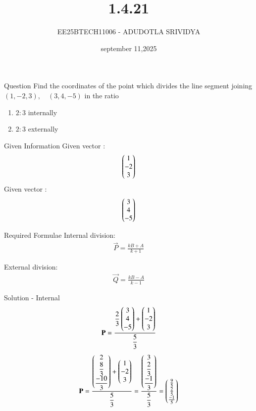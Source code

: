 \documentclass{beamer}
\title %
{1.4.21}
\date{september 11,2025}
\author %
{EE25BTECH11006 - ADUDOTLA SRIVIDYA}
\begin{document}
\frame{\titlepage}

\begin{frame}{Question}
Find the coordinates of the point which divides the line segment joining
$
(1,-2,3), \quad (3,4,-5)
$
in the ratio
\begin{enumerate}[label=(\alph*)]
    \item \(2 : 3\) internally
    \item \(2 : 3\) externally
\end{enumerate}
\end{frame}

\begin{frame}{Given Information}
Given vector :
\begin{align}
\begin{pmatrix} 1 \\ -2 \\ 3 \end{pmatrix}
\end{align}
Given vector :
\begin{align}
\begin{pmatrix} 3 \\ 4 \\ -5 \end{pmatrix}
\end{align}
\end{frame}

\begin{frame}{Required Formulae}
Internal division:
\begin{align}
\vec{P} = \frac{kB+A}{k+1}
\end{align}

External division:
\begin{align}
\vec{Q} = \frac{kB-A}{k-1}
\end{align}
\end{frame}

\begin{frame}{Solution - Internal}
\begin{align}
\mathbf{P} = \frac{\dfrac{2}{3}\begin{pmatrix}3 \\ 4 \\ -5\end{pmatrix} + \begin{pmatrix}1 \\ -2 \\ 3\end{pmatrix}}{\dfrac{5}{3}} 
\end{align}
\begin{align}
    \mathbf{P} = \frac{\begin{pmatrix}2 \\ \dfrac{8}{3} \\ \dfrac{-10}{3}\end{pmatrix} + \begin{pmatrix}1 \\ -2 \\ 3\end{pmatrix}}{\dfrac{5}{3}}
= \frac{\begin{pmatrix}3 \\ \dfrac{2}{3} \\ \dfrac{-1}{3}\end{pmatrix}}{\dfrac{5}{3}}
= \begin{pmatrix}\tfrac{9}{5} \\ \tfrac{2}{5} \\ \tfrac{-1}{5}\end{pmatrix}
\end{align}
\end{frame}
\end{document}
